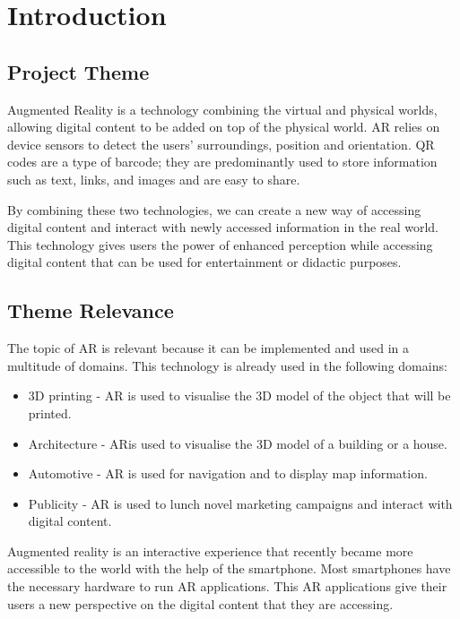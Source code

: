 \chapter{Introduction}\label{cap:introduction}

\section{Project Theme}
Augmented Reality is a technology combining the virtual and physical worlds, allowing digital content to be added on top of the physical world.
\ac{AR} relies on device sensors to detect the users' surroundings, position and orientation. \ac{QR} codes are a type of barcode; they are predominantly used to store information such as text, links, and images and are easy to share.

By combining these two technologies, we can create a new way of accessing digital content and interact with newly accessed information in the real world. This technology gives users the power of enhanced perception while accessing digital content that can be used for entertainment or didactic purposes.


\section{Theme Relevance}
The topic of \ac{AR} is relevant because it can be implemented and used in a multitude of domains. This technology is already used in the following domains:
\begin{itemize}
    \item \ac{3D} printing - \ac{AR} is used to visualise the \ac{3D} model of the object that will be printed.
    \item Architecture - \ac{AR}is used to visualise the \ac{3D} model of a building or a house.
    \item Automotive - \ac{AR} is used for navigation and to display map information.
    \item Publicity - \ac{AR} is used to lunch novel marketing campaigns and interact with digital content.
\end{itemize}


Augmented reality is an interactive experience that recently became more accessible to the world with the help of the smartphone. Most smartphones have the necessary hardware to run \ac{AR} applications. This \ac{AR} applications give their users a new perspective on the digital content that they are accessing.
\pagebreak

